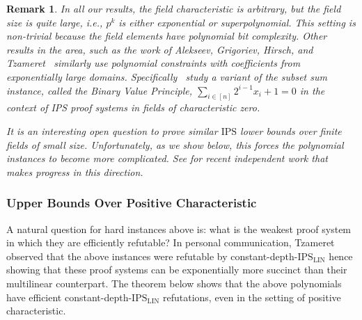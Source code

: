 \documentclass[11pt]{article}
\newtheorem{remark}[theorem]{Remark}
\newcommand{\IPS}{\mathrm{IPS}}
\newcommand{\IPSLIN}{\mathrm{IPS}_{\mathrm{LIN}}}
\begin{document}
\begin{remark}
    In all our results, the field characteristic is arbitrary, but the field size is quite large, i.e., $p^k$ is either exponential or superpolynomial.  This setting is non-trivial because the field elements have polynomial bit complexity. Other results in the area, such as the work of Alekseev, Grigoriev, Hirsch, and Tzameret~\cite{AGHT} similarly use polynomial constraints with coefficients from exponentially large domains. Specifically~\cite{AGHT} study a variant of the subset sum instance, called the Binary Value Principle, $\sum_{i \in [n]} 2^{i-1} x_i + 1 = 0$ in the context of IPS proof systems in fields of characteristic zero. 

    It is an interesting open question to prove similar $\IPS$ lower bounds over finite fields of small size. Unfortunately, as we show below, this forces the polynomial instances to become more complicated. See  for recent independent work that makes progress in this direction.
\end{remark}


\subsubsection{Upper Bounds Over Positive Characteristic}
\label{sec:intro-upper}

A natural question for hard instances above is: what is the weakest proof system in which they are efficiently refutable? In personal communication, Tzameret observed that the above instances were refutable by constant-depth-$\IPSLIN$ hence showing that these proof systems can be exponentially more succinct than their multilinear counterpart. The theorem below shows that the above polynomials have efficient constant-depth-$\IPSLIN$ refutations, even in the setting of positive characteristic. 
\end{document}
